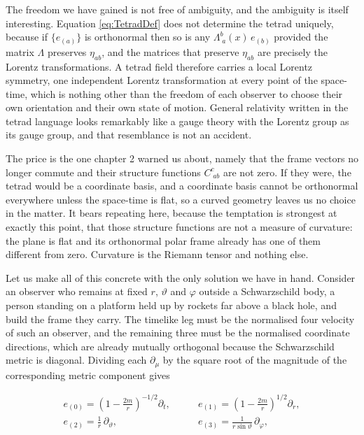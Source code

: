         The freedom we have gained is not free of ambiguity, and the ambiguity is itself interesting. Equation \ref{eq:TetradDef} does not determine the tetrad uniquely, because if $\{e_{(a)}\}$ is orthonormal then so is any $\Lambda^{b}_{\;a}(x)\,e_{(b)}$ provided the matrix $\Lambda$ preserves $\eta_{ab}$, and the matrices that preserve $\eta_{ab}$ are precisely the Lorentz transformations. A tetrad field therefore carries a local Lorentz symmetry, one independent Lorentz transformation at every point of the space-time, which is nothing other than the freedom of each observer to choose their own orientation and their own state of motion. General relativity written in the tetrad language looks remarkably like a gauge theory with the Lorentz group as its gauge group, and that resemblance is not an accident.

        The price is the one chapter 2 warned us about, namely that the frame vectors no longer commute and their structure functions $C^{c}_{\;ab}$ are not zero. If they were, the tetrad would be a coordinate basis, and a coordinate basis cannot be orthonormal everywhere unless the space-time is flat, so a curved geometry leaves us no choice in the matter. It bears repeating here, because the temptation is strongest at exactly this point, that those structure functions are not a measure of curvature: the plane is flat and its orthonormal polar frame already has one of them different from zero. Curvature is the Riemann tensor and nothing else.

        Let us make all of this concrete with the only solution we have in hand. Consider an observer who remains at fixed $r$, $\vartheta$ and $\varphi$ outside a Schwarzschild body, a person standing on a platform held up by rockets far above a black hole, and build the frame they carry. The timelike leg must be the normalised four velocity of such an observer, and the remaining three must be the normalised coordinate directions, which are already mutually orthogonal because the Schwarzschild metric is diagonal. Dividing each $\partial_{\mu}$ by the square root of the magnitude of the corresponding metric component gives

        \begin{align}\label{eq:SchwarzschildTetrad}
            e_{(0)} = \left(1-\frac{2m}{r}\right)^{-1/2}\partial_t, \qquad & e_{(1)} = \left(1-\frac{2m}{r}\right)^{1/2}\partial_r,\\
            e_{(2)} = \frac{1}{r}\,\partial_{\vartheta}, \qquad & e_{(3)} = \frac{1}{r\sin\vartheta}\,\partial_{\varphi},\nonumber
        \end{align}

